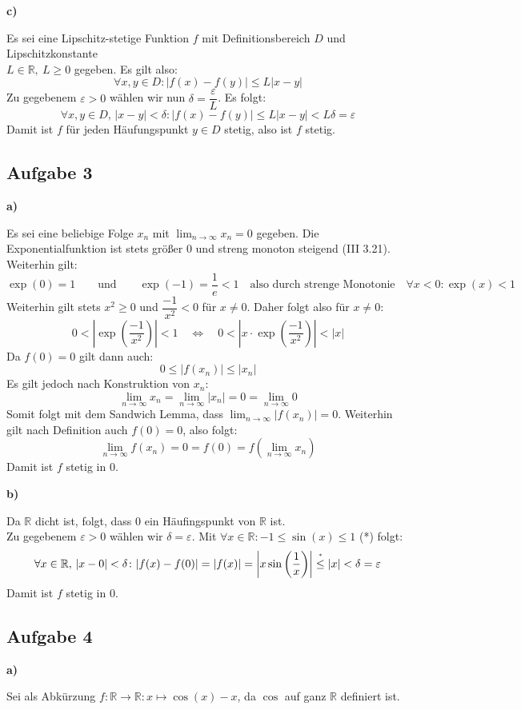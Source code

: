 \documentclass[a4paper,graphics,11pt]{article}
\newcommand{\aufgabe}[1]{\subsection*{Aufgabe #1}}
\newcommand{\up}[2]{\mathrel{\overset{\makebox[0pt]{\mbox{\normalfont\tiny #2}}}{#1}}}
\begin{document}
\textbf{c)}

Es sei eine Lipschitz-stetige Funktion $f$ mit Definitionsbereich $D$ und Lipschitzkonstante\\
$L \in \mathbb{R},\ L \geq 0$ gegeben. Es gilt also:
$$
    \forall x,y \in D\colon
    |f(x)-f(y)| \leq L|x-y|
$$
Zu gegebenem $\varepsilon > 0$ wählen wir nun $\delta = \dfrac{\varepsilon}{L}$. Es folgt:
$$
    \forall x,y \in D,\,|x-y| < \delta \colon
    |f(x)-f(y)| \leq L|x-y| < L \delta = \varepsilon
$$
Damit ist $f$ für jeden Häufungspunkt $y \in D$ stetig, also ist $f$ stetig.


\aufgabe{3}
\textbf{a)}

Es sei eine beliebige Folge $x_n$ mit $\lim_{n \to \infty}\limits x_n = 0$ gegeben.
Die Exponentialfunktion ist stets größer 0 und streng monoton steigend (III 3.21).
Weiterhin gilt:
$$
    \exp(0) = 1
    \qquad\text{und}\qquad
    \exp(-1) = \frac{1}{e} < 1
    \quad\text{also durch strenge Monotonie}\quad
    \forall x < 0 \colon \exp(x) < 1
$$
Weiterhin gilt stets $x^2 \geq 0$ und $\dfrac{-1}{x^2} < 0$ für $x\neq 0$.
Daher folgt also für $x \neq 0\colon$
$$
    0 < \left|\exp\left(\frac{-1}{x^2}\right)\right| < 1
    \quad \Longleftrightarrow\quad
    0 < \left|x\cdot\exp\left(\frac{-1}{x^2}\right)\right| < |x|
$$
Da $f(0) = 0$ gilt dann auch:
$$
    0 \leq |f(x_n)| \leq |x_n|
$$
Es gilt jedoch nach Konstruktion von $x_n\colon$
$$
    \lim_{n \to \infty}\limits x_n
    = \lim_{n \to \infty}\limits |x_n|
    = 0
    = \lim_{n \to \infty}\limits 0
$$
Somit folgt mit dem Sandwich Lemma, dass $\lim_{n \to \infty}\limits |f(x_n)| = 0$.
Weiterhin gilt nach Definition auch $f(0) = 0$, also folgt:
$$
    \lim_{n \to \infty} f(x_n) = 0 = f(0) = f\left(\lim_{n \to \infty} x_n\right)
$$
Damit ist $f$ stetig in 0.

\textbf{b)}

Da $\mathbb{R}$ dicht ist, folgt, dass 0 ein Häufingspunkt von $\mathbb{R}$ ist.\\
Zu gegebenem $\varepsilon > 0$ wählen wir $\delta = \varepsilon$.
Mit $\forall x \in \mathbb{R}\colon -1 \leq \sin(x) \leq 1$ (*) folgt:
$$
    \forall x \in \mathbb{R},\, |x-0| < \delta\colon
    |f(x) - f(0)| = |f(x)| = \left|x \sin\left(\frac{1}{x}\right)\right|
    \up{\leq}{*} |x| < \delta = \varepsilon
$$
Damit ist $f$ stetig in 0.

\newpage

\aufgabe{4}
\textbf{a)}

Sei als Abkürzung $f\colon \mathbb{R} \to \mathbb{R}\colon x \mapsto \cos(x) -x$, da
$\cos$  auf ganz $\mathbb{R}$ definiert ist.
\end{document}
